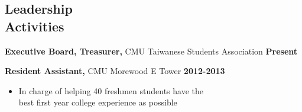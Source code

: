\documentclass[sectioned]{dsyangres}
\begin{document}
\begin{resume}
\section{Leadership \\ Activities}

\textbf{Executive Board, Treasurer,} CMU Taiwanese Students
  Association \hfill \textbf{ Present}

\textbf{Resident Assistant,} CMU Morewood E Tower \hfill \textbf{2012-2013}
  \begin{itemize} \itemsep -2pt
    \item In charge of helping 40 freshmen students have the\\ best
      first year college experience as possible
  \end{itemize}


\end{resume}
\end{document}
